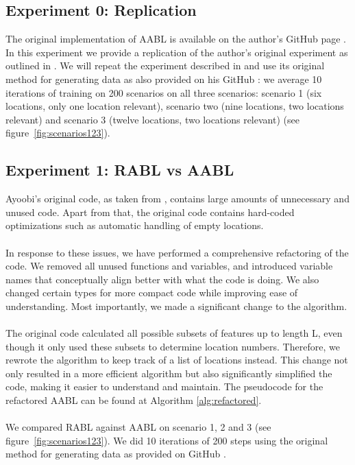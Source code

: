 \documentclass{article}
\begin{document}
\setcounter{subsection}{-1}
\subsection{Experiment 0: Replication}
\label{method0}
The original implementation of AABL is available on the author's GitHub page \cite{ayoobiGithub}. In this experiment we provide a replication of the author's original experiment as outlined in \cite{ayoobi2023fullthesis}. 
We will repeat the experiment described in \cite{ayoobi2023fullthesis} and use its original method for generating data as also provided on his GitHub \cite{ayoobiGithub}: we average 10 iterations of training on 200 scenarios on all three scenarios: scenario 1 (six locations, only one location relevant), scenario two (nine locations, two locations relevant) and scenario 3 (twelve locations, two locations relevant) (see figure~\ref{fig:scenarios123}).

\subsection{Experiment 1: RABL vs AABL}
\label{method1}
Ayoobi's original code, as taken from \cite{ayoobiGithub}, contains large amounts of unnecessary and unused code. Apart from that, the original code contains hard-coded optimizations such as automatic handling of empty locations.
\\\\
In response to these issues, we have performed a comprehensive refactoring of the code. We removed all unused functions and variables, and introduced variable names that conceptually align better with what the code is doing. We also changed certain types for more compact code while improving ease of understanding. Most importantly, we made a significant change to the algorithm.
\\\\
The original code calculated all possible subsets of features up to length L, even though it only used these subsets to determine location numbers. Therefore, we rewrote the algorithm to keep track of a list of locations instead. This change not only resulted in a more efficient algorithm but also significantly simplified the code, making it easier to understand and maintain. The pseudocode for the refactored AABL can be found at Algorithm \ref{alg:refactored}.
\\\\
We compared RABL against AABL \cite{ayoobiGithub} on scenario 1, 2 and 3 (see figure~\ref{fig:scenarios123}). We did 10 iterations of 200 steps using the original method for generating data as provided on GitHub \cite{ayoobiGithub}. 
\end{document}
